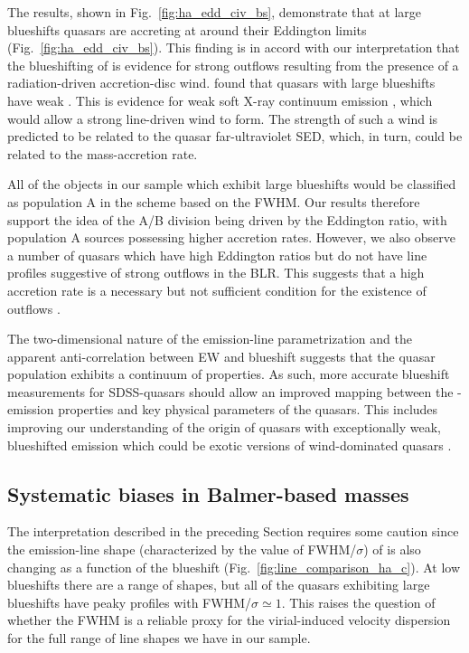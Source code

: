The results, shown in Fig.~\ref{fig:ha_edd_civ_bs}, demonstrate that at large blueshifts quasars are accreting at around their Eddington limits (Fig.~\ref{fig:ha_edd_civ_bs}). 
This finding is in accord with our interpretation that the blueshifting of  is evidence for strong outflows resulting from the presence of a radiation-driven accretion-disc wind. 
\citet{richards02} found that quasars with large  blueshifts have weak .
This is evidence for weak soft X-ray continuum emission \citep{leighly04}, which would allow a strong line-driven wind to form.  
The strength of such a wind is predicted to be related to the quasar far-ultraviolet SED, which, in turn, could be related to the mass-accretion rate.

All of the objects in our sample which exhibit large  blueshifts would be classified as population A in the \citet{sulentic00b} scheme based on the \ha FWHM. 
Our results therefore support the idea of the \citet{sulentic00b} A/B division being driven by the Eddington ratio, with population A sources possessing higher accretion rates.
However, we also observe a number of quasars which have high Eddington ratios but do not have line profiles suggestive of strong outflows in the  BLR.  
This suggests that a high accretion rate is a necessary but not sufficient condition for the existence of outflows \citep{baskin05}. 

The two-dimensional nature of the  emission-line parametrization and the apparent anti-correlation between  EW and  blueshift suggests that the quasar population exhibits a continuum of properties. 
As such, more accurate  blueshift measurements for SDSS-quasars should allow an improved mapping between the -emission properties and key physical parameters of the quasars.
This includes improving our understanding of the origin of quasars with exceptionally weak, blueshifted  emission \citep[weak emission-line quasars;][]{luo15} which could be exotic versions of wind-dominated quasars \citep{plotkin15}.

\subsection{Systematic biases in Balmer-based masses}

The interpretation described in the preceding Section requires some caution since the emission-line shape (characterized by the value of FWHM/$\sigma$) of \ha is also changing as a function of the  blueshift (Fig.~\ref{fig:line_comparison_ha_c}). 
At low  blueshifts there are a range of shapes, but all of the quasars exhibiting large  blueshifts have peaky \ha profiles with FWHM/$\sigma \simeq 1$. 
This raises the question of whether the \ha FWHM is a reliable proxy for the virial-induced velocity dispersion for the full range of \ha line shapes we have in our sample. 

